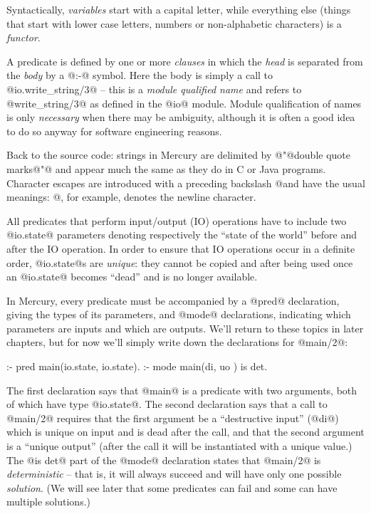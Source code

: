 Syntactically, \emph{variables} start with a capital letter, while
everything else (things that start with lower case letters, numbers or
non-alphabetic characters) is a \emph{functor}.

A predicate is defined by one or more \emph{clauses} in which the
\emph{head} is separated from the \emph{body} by a @:-@ symbol.  Here
the body is simply a call to @io.write_string/3@ -- this is a
\emph{module qualified name} and refers to @write_string/3@ as defined
in the @io@ module.  Module qualification of names is only
\emph{necessary} when there may be ambiguity, although it is often a
good idea to do so anyway for software engineering reasons.

Back to the source code: strings in Mercury are delimited by @"@double
quote marks@"@ and appear much the same as they do in C or Java
programs.  Character escapes are introduced with a preceding backslash
@\@ and have the usual meanings: @\n@, for example, denotes the newline
character.

All predicates that perform input/output (IO) operations have to include
two @io.state@ parameters denoting respectively the ``state of the
world'' before and after the IO operation.  In order to ensure that IO
operations occur in a definite order, @io.state@s are \emph{unique}:
they cannot be copied and after being used once an @io.state@ becomes
``dead'' and is no longer available.

In Mercury, every predicate must be accompanied by a @pred@ declaration,
giving the types of its parameters, and @mode@ declarations, indicating
which parameters are inputs and which are outputs.  We'll return to
these topics in later chapters, but for now we'll simply write down the
declarations for @main/2@:
\begin{myverbatim}
:- pred main(io.state, io.state).
:- mode main(di,       uo      ) is det.
\end{myverbatim}
The first declaration says that @main@ is a predicate with two
arguments, both of which have type @io.state@.  The second declaration
says that a call to @main/2@ requires that the first argument be a
``destructive input'' (@di@) which is unique on input and is dead
after the call, and that the second argument is a ``unique
output'' (\ie after the call it will be instantiated with a unique value.)
The @is det@ part of the @mode@ declaration states that @main/2@ is
\emph{deterministic} -- that is, it will always succeed and will have
only one possible \emph{solution}.  (We will see later that some
predicates can fail and some can have multiple solutions.)

